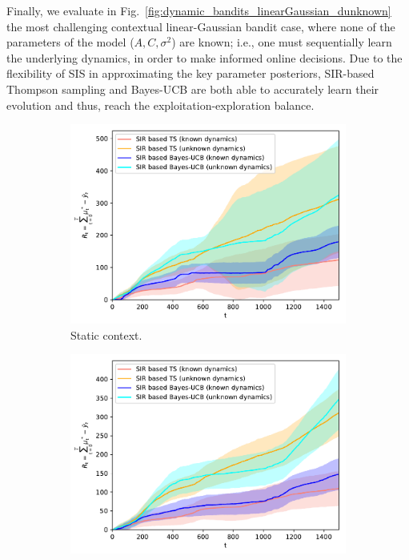 \documentclass{article}
\newcommand{\ie}{i.e., }
\begin{document}
Finally, we evaluate in Fig.~\ref{fig:dynamic_bandits_linearGaussian_dunknown} the most challenging contextual linear-Gaussian bandit case, where none of the parameters of the model ($A,C,\sigma^2$) are known; \ie one must sequentially learn the underlying dynamics, in order to make informed online decisions. Due to the flexibility of SIS in approximating the key parameter posteriors, SIR-based Thompson sampling and Bayes-UCB are both able to accurately learn their evolution and thus, reach the exploitation-exploration balance.

\begin{figure}[!h]
	\begin{subfigure}[b]{0.49\textwidth}
		\includegraphics[width=\textwidth]{./figs/dynamic/linearGaussian/cumulative_regret_all_dunknown_cstatic}
		\caption{Static context.}
		\label{fig:dynamic_bandits_linearGaussian_cstatic_dunknown}
	\end{subfigure}
	\begin{subfigure}[b]{0.49\textwidth}
		\includegraphics[width=\textwidth]{./figs/dynamic/linearGaussian/cumulative_regret_all_dunknown_crand}

\end{subfigure}
\end{figure}
\end{document}

